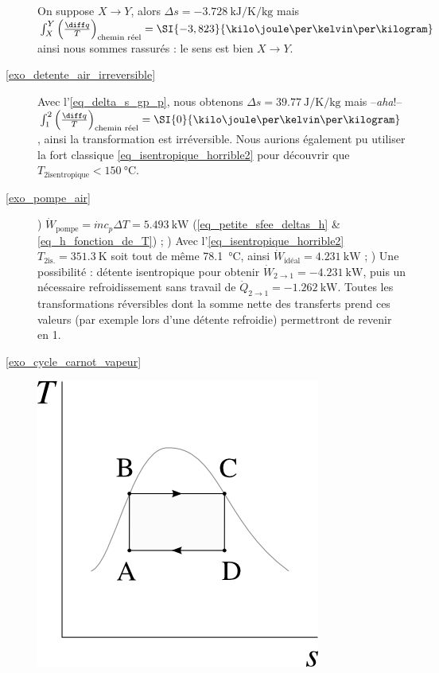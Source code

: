 \begin{description}
						\tab On suppose $X\to Y$, alors $\Delta s = \SI{-3,728}{\kilo\joule\per\kelvin\per\kilogram}$ mais $\int_X^Y \left(\frac{\diff q}{T}\right)_\text{chemin réel} = \SI{-3,823}{\kilo\joule\per\kelvin\per\kilogram}$ ainsi nous sommes rassurés : le sens est bien $X\to Y$.
		\item [\ref{exo_detente_air_irreversible}]
						\tab Avec l’\cref{eq_delta_s_gp_p}, nous obtenons $\Delta s = \SI{+39,77}{\joule\per\kelvin\per\kilogram}$ mais --\textit{aha}!-- $\int_1^2 \left(\frac{\diff q}{T}\right)_\text{chemin réel} = \SI{0}{\kilo\joule\per\kelvin\per\kilogram}$, ainsi la transformation est irréversible. Nous aurions également pu utiliser la fort classique \cref{eq_isentropique_horrible2} pour découvrir que $T_{2 \text{isentropique}} < \SI{150}{\degreeCelsius}$.
		\item [\ref{exo_pompe_air}] 	
						) $\dot{W}_\text{pompe} = \dot m c_p \Delta T = \SI{+5,493}{\kilo\watt}$ (\ref{eq_petite_sfee_deltas_h} \& \ref{eq_h_fonction_de_T}) ;
						) Avec l’\cref{eq_isentropique_horrible2} $T_{2 \text{is.}} = \SI{351,3}{\kelvin}$ soit tout de même \SI{78,1}{\degreeCelsius}, ainsi $\dot{W}_\text{idéal} = \SI{+4,231}{\kilo\watt}$ ;
						) Une possibilité : détente isentropique pour obtenir $\dot{W}_{2\to 1} = \SI{-4,231}{\kilo\watt}$, puis un nécessaire refroidissement sans travail de $\dot{Q}_{2\to 1} = \SI{-1,262}{\kilo\watt}$. Toutes les transformations réversibles dont la somme nette des transferts prend ces valeurs (par exemple lors d’une détente refroidie) permettront de revenir en 1. 
		\item [\ref{exo_cycle_carnot_vapeur}]
						\includegraphics[width=\solutiondiagramwidth]{images/exo_sol_ts_carnot_vapeur1.png} 

\end{description}

